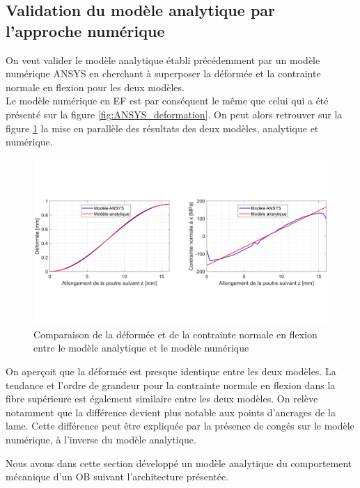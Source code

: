 		\subsection{Validation du modèle analytique par l'approche numérique} 
On veut valider le modèle analytique établi précédemment par un modèle numérique ANSYS en cherchant à superposer la déformée et la contrainte normale en flexion pour les deux modèles.\\
Le modèle numérique en EF est par conséquent le même que celui qui a été présenté sur la figure \ref{fig:ANSYS_deformation}. On peut alors retrouver sur la figure \ref{fig:comparaison_ANSYS_analytique}
la mise en parallèle des résultats des deux modèles, analytique et numérique.
\begin{figure}[!htbp]
\begin{center}
    \captionsetup{justification=centering}
	\includegraphics[trim={0cm 4cm 0cm 4.5cm},clip, width=\textwidth]{../Chap3/Figure/comparaison_ANSYS_analytique.pdf}
	\caption{Comparaison de la déformée et de la contrainte normale en flexion entre le modèle analytique et le modèle numérique}
	\label{fig:comparaison_ANSYS_analytique}
\end{center}
\end{figure}
On aperçoit que la déformée est presque identique entre les deux modèles. La tendance et l'ordre de grandeur pour la contrainte normale en flexion dans la fibre supérieure est également similaire entre les deux modèles. On relève notamment que la différence devient plus notable aux points d'ancrages de la lame. Cette différence peut être expliquée par la présence de congés sur le modèle numérique, à l'inverse du modèle analytique.

Nous avons dans cette section développé un modèle analytique du comportement mécanique d'un OB suivant l'architecture présentée.

